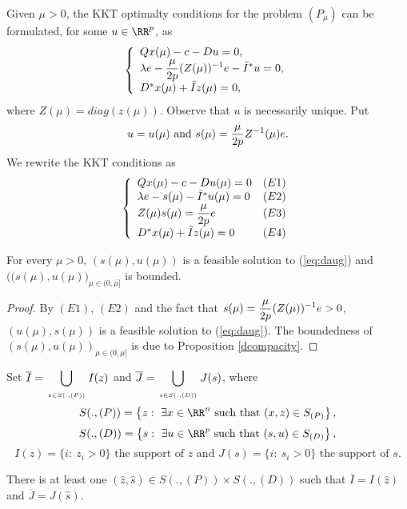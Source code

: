 Given $\mu>0$, the KKT optimalty conditions for the problem $(P_\mu)$ can be formulated, for some $u\in\RR^p$, as
$$\left\{\begin{array}{ll}Qx(\mu)-c-Du=0,\\ \lambda e-\displaystyle{ \mu\over 2p}(Z(\mu))^{-1}e-{\tilde I}^*u=0,\\ D^*x(\mu)+{\tilde I}z(\mu)=0,\end{array}\right.$$
where $Z(\mu)=diag(z(\mu))$.
Observe that $u$ is necessarily unique. Put 
$$u=u(\mu)\mbox{ and }s(\mu)=\displaystyle {\mu\over 2p}Z^{-1}(\mu)e.$$ We rewrite the KKT conditions as
$$\left\{\begin{array}{lr}Qx(\mu)-c-Du(\mu)=0&(E1)\\ \lambda e-s(\mu)-{\tilde I}^*u(\mu)=0&(E2)\\ Z(\mu)s(\mu)=\displaystyle {\mu\over 2p}e&(E3)\\D^*x(\mu)+{\tilde I}z(\mu)=0&(E4)\end{array}\right.$$

\begin{proposition}
For every $\mu>0$, $(s(\mu),u(\mu))$ is a feasible solution to (\ref{eq:daug}) and $\big((s(\mu),u(\mu)\big)_{\mu\in(0,\overline{\mu}]}$ is bounded.
\end{proposition}

\begin{proof}
By $(E1)$, $(E2)$ and the fact that $s(\mu)=\displaystyle {\mu\over 2p}(Z(\mu))^{-1}e>0$, $(u(\mu),s(\mu))$ is a feasible solution to (\ref{eq:daug}). The boundedness of $(s(\mu),u(\mu))_{\mu\in(0,{\overline\mu}]}$ is due to Proposition \ref{dcompacity}.
\end{proof} 


Set ${\overline I}=\displaystyle\bigcup_{\atop z\in S(.,(P))}I(z)$ and ${\overline J}=\displaystyle\bigcup_{\atop s\in S(.,(D))}J(s)$, where 
$$S(.,(P))=\left\{z:\ \exists x\in\RR^n\mbox{ such that } (x,z)\in S_{(P)}\right\},$$ 
$$S(.,(D))=\left\{s:\ \exists u\in\RR^p\mbox{ such that } (s,u)\in S_{(D)}\right\},$$ $$I(z)=\{i:\ z_i>0\}\mbox{ the support of }z\mbox{ and }J(s)=\{i:\ s_i>0\}\mbox{ the support of }s.$$  

\begin{lemma}\label{complementarity}

There is at least one $({\hat z},\hat{s})\in S(.,(P))\times S(.,(D))$ such that ${\overline I}=I({\hat z})$ and $\overline{J}=J(\hat{s})$.
\end{lemma}

